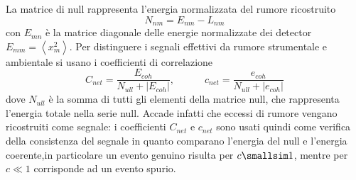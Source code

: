 La matrice di null rappresenta l'energia normalizzata del rumore ricostruito
\begin{equation}
	N_{nm} = E_{nm}-L_{nm}
\end{equation}
con $E_{mn}$  è la matrice diagonale delle energie normalizzate dei detector $E_{mm}  = \left<x_m^2\right>$. Per distinguere i segnali effettivi da rumore strumentale e ambientale si usano i coefficienti di correlazione 
\begin{equation}
	C_{net} = \frac{E_{coh}}{N_{ull}+|E_{coh}|}, \quad\quad\quad c_{net} = \frac{e_{coh}}{N_{ull}+|e_{coh}|}
	\label{eqn:coefficient_energy}
\end{equation}
dove $N_{ull}$ è la somma di tutti gli elementi della matrice null, che rappresenta l'energia totale nella serie null. Accade infatti che eccessi di rumore vengano ricostruiti come segnale: i coefficienti $C_{net}$ e $c_{net}$ sono usati quindi come verifica della consistenza del segnale in quanto comparano l'energia del null e l'energia coerente\cite{Klimenko_2008},in particolare un evento genuino risulta per $c\smallsim 1$, mentre per $c \ll 1$ corrisponde ad un evento spurio\cite{Klimenko_2016}.






